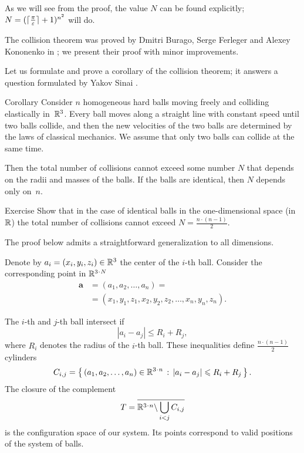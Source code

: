 As we will see from the proof,
the value $N$ can be found explicitly;
$N=(\lceil\tfrac\pi{\varepsilon}\rceil+1)^{n^2}$
will do.

The collision theorem was proved by Dmitri Burago, Serge Ferleger and Alexey Kononenko in \cite{burago-ferleger-kononenko-1997};
we present their proof with minor improvements.

Let us formulate and prove a corollary of the  collision theorem;
it answers a question formulated by Yakov Sinai \cite{galperin}.

\begin{thm}{Corollary}\label{cor:balls}
Consider $n$ homogeneous hard balls
moving freely and colliding
elastically in~$\mathbb{R}^3$. 
Every ball moves
along a straight line with constant speed until two balls collide, and then
the new velocities of the two balls are determined by the
laws of classical mechanics. 
We assume that only two balls can collide at the same time.

Then the total number of collisions cannot exceed some number $N$ that  depends on the radii and masses of the balls.
If the balls are identical, then $N$ depends only on~$n$.
\end{thm}

\begin{thm}{Exercise}\label{cor:balls:dim=1}
Show that in the case of identical balls in the one-dimensional space (in $\mathbb{R}$) 
the total number of collisions cannot exceed $N=\tfrac{n\cdot(n-1)}2$.
\end{thm}



The proof below admits a straightforward generalization to all dimensions.

Denote by $a_i=(x_i,y_i,z_i) \in \mathbb{R}^3$ the center of the $i$-th ball.
Consider the corresponding point in $\RR^{3\cdot N}$
\begin{align*}
\bm{a}&=(a_1, a_2 , \dots , a_n ) =
\\
&=(x_1, y_1 , z_1 , x_2 , y_2 , z_2 , \dots , x_n , y_n , z_n).
\end{align*}

The $i$-th and $j$-th ball intersect if 
$$|a_i - a_j | \le R_i+R_j,$$
where $R_i$ denotes the radius of the $i$-th ball.
These inequalities define $\tfrac{n\cdot(n-1)}{2}$ cylinders 
\[C_{i,j}=\set{(a_1, a_2 , \dots , a_n )\in\RR^{3\cdot n}} {|a_i - a_j |\le R_i+R_j}.\] 
The closure of the complement
\[T=\overline{\RR^{3\cdot n}\backslash \bigcup_{i< j} C_{i,j}}\] 
is the configuration space of our system. 
Its points correspond
to valid positions of the system of balls.

